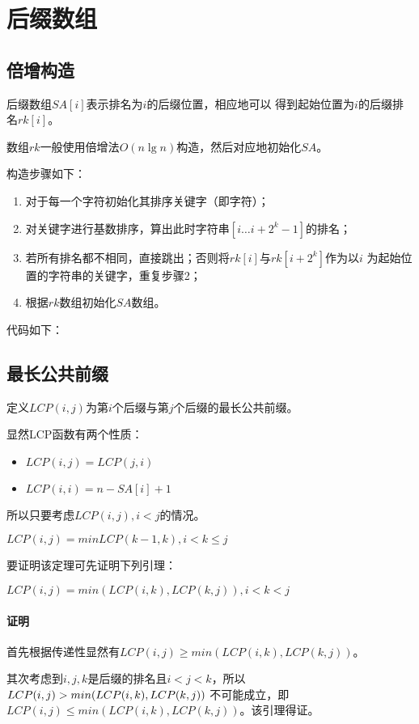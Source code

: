 \section{后缀数组}
\subsection{倍增构造}
后缀数组$SA[i]$表示排名为$i$的后缀位置，相应地可以
得到起始位置为$i$的后缀排名$rk[i]$。

数组$rk$一般使用倍增法$O(n\lg n)$构造，然后对应地初始化$SA$。

构造步骤如下：
\begin{enumerate}
    \item 对于每一个字符初始化其排序关键字（即字符）；
    \item 对关键字进行基数排序，算出此时字符串$[i\ldots i+2^k-1]$的排名；
    \item 若所有排名都不相同，直接跳出；否则将$rk[i]$与$rk[i+2^k]$作为以$i$
    为起始位置的字符串的关键字，重复步骤2；
    \item 根据$rk$数组初始化$SA$数组。
\end{enumerate}
代码如下：

\subsection{最长公共前缀}
定义$LCP(i,j)$为第$i$个后缀与第$j$个后缀的最长公共前缀。

显然LCP函数有两个性质：
\begin{itemize}
    \item $LCP(i,j)=LCP(j,i)$
    \item $LCP(i,i)=n-SA[i]+1$
\end{itemize}
所以只要考虑$LCP(i,j),i<j$的情况。
\begin{theorem}
    $LCP(i,j)=min{LCP(k-1,k)},i<k\leq j$
\end{theorem}
要证明该定理可先证明下列引理：
\begin{lemma}
    $LCP(i,j)=min(LCP(i,k),LCP(k,j)),i<k<j$
\end{lemma}
\paragraph{证明}
首先根据传递性显然有$LCP(i,j)\geq min(LCP(i,k),LCP(k,j))$。

其次考虑到$i,j,k$是后缀的排名且$i<j<k$，所以$LCP(i,j)>min(LCP(i\\,k),LCP(k,j))$
不可能成立，即$LCP(i,j)\leq min(LCP(i,k),LCP(k,j))$。该引理得证。

